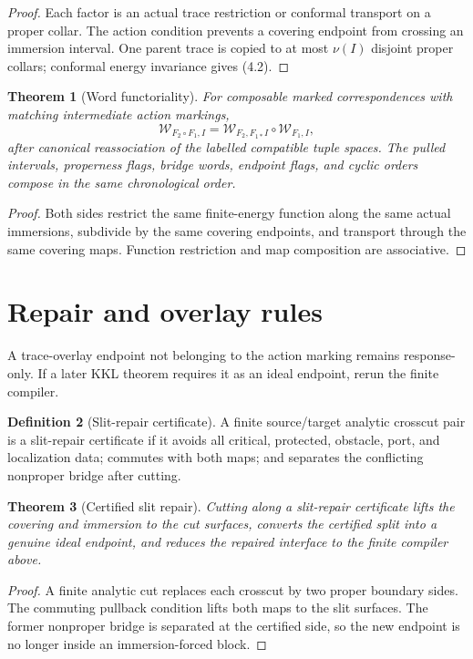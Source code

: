 \documentclass[11pt]{article}
\newtheorem{theorem}{Theorem}[section]
\theoremstyle{definition}
\newtheorem{definition}[theorem]{Definition}
\theoremstyle{remark}
\begin{document}
\begin{proof}
Each factor is an actual trace restriction or conformal transport on a proper
collar.  The action condition prevents a covering endpoint from crossing an
immersion interval.  One parent trace is copied to at most $\nu(I)$ disjoint
proper collars; conformal energy invariance gives (4.2).
\end{proof}

\begin{theorem}[Word functoriality]
For composable marked correspondences with matching intermediate action
markings,
\[
 \boxed{
 \mathcal W_{F_2\circ F_1,I}
 =\mathcal W_{F_2,F_{1*}I}\circ\mathcal W_{F_1,I},
 }
 \tag{4.3}
\]
after canonical reassociation of the labelled compatible tuple spaces.  The
pulled intervals, properness flags, bridge words, endpoint flags, and cyclic
orders compose in the same chronological order.
\end{theorem}

\begin{proof}
Both sides restrict the same finite-energy function along the same actual
immersions, subdivide by the same covering endpoints, and transport through the
same covering maps.  Function restriction and map composition are associative.
\end{proof}

\section{Repair and overlay rules}
A trace-overlay endpoint not belonging to the action marking remains
response-only.  If a later KKL theorem requires it as an ideal endpoint, rerun
the finite compiler.

\begin{definition}[Slit-repair certificate]
A finite source/target analytic crosscut pair is a slit-repair certificate if it
avoids all critical, protected, obstacle, port, and localization data; commutes
with both maps; and separates the conflicting nonproper bridge after cutting.
\end{definition}

\begin{theorem}[Certified slit repair]
Cutting along a slit-repair certificate lifts the covering and immersion to the
cut surfaces, converts the certified split into a genuine ideal endpoint, and
reduces the repaired interface to the finite compiler above.
\end{theorem}

\begin{proof}
A finite analytic cut replaces each crosscut by two proper boundary sides.  The
commuting pullback condition lifts both maps to the slit surfaces.  The former
nonproper bridge is separated at the certified side, so the new endpoint is no
longer inside an immersion-forced block.
\end{proof}
\end{document}
